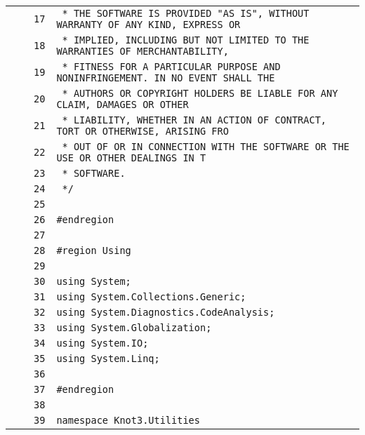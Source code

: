 \documentclass[a4paper,10pt]{article}
\begin{document}
\begin{longtable}[l]{lrrl}
\cellcolor{gray} &  & \verb~17~ & \verb~ * THE SOFTWARE IS PROVIDED "AS IS", WITHOUT WARRANTY OF ANY KIND, EXPRESS OR~\\
\cellcolor{gray} &  & \verb~18~ & \verb~ * IMPLIED, INCLUDING BUT NOT LIMITED TO THE WARRANTIES OF MERCHANTABILITY,~\\
\cellcolor{gray} &  & \verb~19~ & \verb~ * FITNESS FOR A PARTICULAR PURPOSE AND NONINFRINGEMENT. IN NO EVENT SHALL THE~\\
\cellcolor{gray} &  & \verb~20~ & \verb~ * AUTHORS OR COPYRIGHT HOLDERS BE LIABLE FOR ANY CLAIM, DAMAGES OR OTHER~\\
\cellcolor{gray} &  & \verb~21~ & \verb~ * LIABILITY, WHETHER IN AN ACTION OF CONTRACT, TORT OR OTHERWISE, ARISING FRO~\\
\cellcolor{gray} &  & \verb~22~ & \verb~ * OUT OF OR IN CONNECTION WITH THE SOFTWARE OR THE USE OR OTHER DEALINGS IN T~\\
\cellcolor{gray} &  & \verb~23~ & \verb~ * SOFTWARE.~\\
\cellcolor{gray} &  & \verb~24~ & \verb~ */~\\
\cellcolor{gray} &  & \verb~25~ & \verb~~\\
\cellcolor{gray} &  & \verb~26~ & \verb~#endregion~\\
\cellcolor{gray} &  & \verb~27~ & \verb~~\\
\cellcolor{gray} &  & \verb~28~ & \verb~#region Using~\\
\cellcolor{gray} &  & \verb~29~ & \verb~~\\
\cellcolor{gray} &  & \verb~30~ & \verb~using System;~\\
\cellcolor{gray} &  & \verb~31~ & \verb~using System.Collections.Generic;~\\
\cellcolor{gray} &  & \verb~32~ & \verb~using System.Diagnostics.CodeAnalysis;~\\
\cellcolor{gray} &  & \verb~33~ & \verb~using System.Globalization;~\\
\cellcolor{gray} &  & \verb~34~ & \verb~using System.IO;~\\
\cellcolor{gray} &  & \verb~35~ & \verb~using System.Linq;~\\
\cellcolor{gray} &  & \verb~36~ & \verb~~\\
\cellcolor{gray} &  & \verb~37~ & \verb~#endregion~\\
\cellcolor{gray} &  & \verb~38~ & \verb~~\\
\cellcolor{gray} &  & \verb~39~ & \verb~namespace Knot3.Utilities~\\

\end{longtable}
\end{document}
